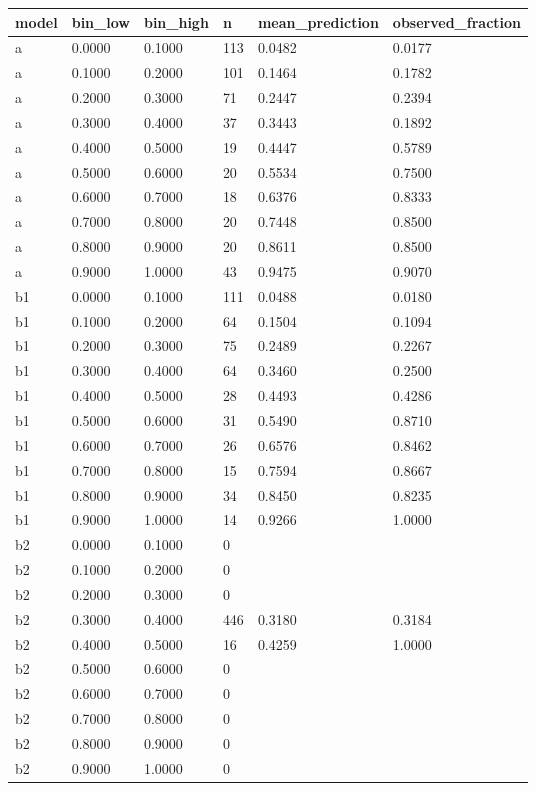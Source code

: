 \begin{tabular}{llllll}
\hline
model & bin\_low & bin\_high & n & mean\_prediction & observed\_fraction \\
\hline
a & 0.0000 & 0.1000 & 113 & 0.0482 & 0.0177 \\
a & 0.1000 & 0.2000 & 101 & 0.1464 & 0.1782 \\
a & 0.2000 & 0.3000 & 71 & 0.2447 & 0.2394 \\
a & 0.3000 & 0.4000 & 37 & 0.3443 & 0.1892 \\
a & 0.4000 & 0.5000 & 19 & 0.4447 & 0.5789 \\
a & 0.5000 & 0.6000 & 20 & 0.5534 & 0.7500 \\
a & 0.6000 & 0.7000 & 18 & 0.6376 & 0.8333 \\
a & 0.7000 & 0.8000 & 20 & 0.7448 & 0.8500 \\
a & 0.8000 & 0.9000 & 20 & 0.8611 & 0.8500 \\
a & 0.9000 & 1.0000 & 43 & 0.9475 & 0.9070 \\
b1 & 0.0000 & 0.1000 & 111 & 0.0488 & 0.0180 \\
b1 & 0.1000 & 0.2000 & 64 & 0.1504 & 0.1094 \\
b1 & 0.2000 & 0.3000 & 75 & 0.2489 & 0.2267 \\
b1 & 0.3000 & 0.4000 & 64 & 0.3460 & 0.2500 \\
b1 & 0.4000 & 0.5000 & 28 & 0.4493 & 0.4286 \\
b1 & 0.5000 & 0.6000 & 31 & 0.5490 & 0.8710 \\
b1 & 0.6000 & 0.7000 & 26 & 0.6576 & 0.8462 \\
b1 & 0.7000 & 0.8000 & 15 & 0.7594 & 0.8667 \\
b1 & 0.8000 & 0.9000 & 34 & 0.8450 & 0.8235 \\
b1 & 0.9000 & 1.0000 & 14 & 0.9266 & 1.0000 \\
b2 & 0.0000 & 0.1000 & 0 &  &  \\
b2 & 0.1000 & 0.2000 & 0 &  &  \\
b2 & 0.2000 & 0.3000 & 0 &  &  \\
b2 & 0.3000 & 0.4000 & 446 & 0.3180 & 0.3184 \\
b2 & 0.4000 & 0.5000 & 16 & 0.4259 & 1.0000 \\
b2 & 0.5000 & 0.6000 & 0 &  &  \\
b2 & 0.6000 & 0.7000 & 0 &  &  \\
b2 & 0.7000 & 0.8000 & 0 &  &  \\
b2 & 0.8000 & 0.9000 & 0 &  &  \\
b2 & 0.9000 & 1.0000 & 0 &  &  \\
\hline
\end{tabular}
